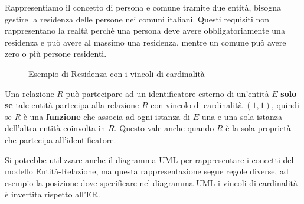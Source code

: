 \documentclass[a4paper]{article}
\begin{document}
\begin{example}
  Rappresentiamo il concetto di persona e comune tramite due entità, bisogna gestire
  la residenza delle persone nei comuni italiani. Questi requisiti non rappresentano
  la realtà perchè una persona deve avere obbligatoriamente una residenza e può avere
  al massimo una residenza, mentre un comune può avere zero o più persone residenti.
  \begin{figure}[H]
    \centering
    \caption{Esempio di Residenza con i vincoli di cardinalità}
  \end{figure}
\end{example}

\begin{definition}
  Una relazione \( R \) può partecipare ad un identificatore esterno di un'entità \( E \)
  \textbf{solo se} tale entità partecipa alla relazione \( R \) con vincolo di
  cardinalità \( (1, 1) \), quindi se \( R \) è una \textbf{funzione} che associa ad
  ogni istanza di \( E \) una e una sola istanza dell'altra entità coinvolta in \( R \).
  Questo vale anche quando \( R \) è la sola proprietà che partecipa all'identificatore.
\end{definition}

\vspace{1em}
\noindent
Si potrebbe utilizzare anche il diagramma UML per rappresentare i concetti del modello
Entità-Relazione, ma questa rappresentazione segue regole diverse, ad esempio la
posizione dove specificare nel diagramma UML i vincoli di cardinalità è invertita rispetto
all'ER.
\end{document}
